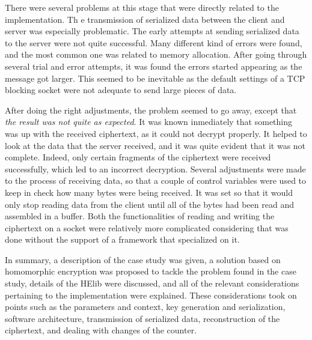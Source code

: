 There were several problems at this stage that were directly related to the implementation. Th
e transmission of serialized data between the client and server was especially problematic. The early attempts at sending serialized data to the server were not quite successful. Many different kind of errors were found, and the most common one was related to memory allocation. After going through several trial and error attempts, it was found the errors started appearing as the message got larger. This seemed to be inevitable as the default settings of a TCP blocking socket were not adequate to send large pieces of data. 

After doing the right adjustments, the problem seemed to go away, except that \textit{the result was not quite as expected}. It was known inmediately that something was up with the received ciphertext, as it could not decrypt properly. It helped to look at the data that the server received, and it was quite evident that it was not complete. Indeed, only certain fragments of the ciphertext were received successfully, which led to an incorrect decryption. Several adjustments were made to the process of receiving data, so that a couple of control variables were used to keep in check how many bytes were being received. It was set so that it would only stop reading data from the client until all of the bytes had been read and assembled in a buffer. Both the functionalities of reading and writing the ciphertext on a socket were relatively more complicated considering that was done without the support of a framework that specialized on it.

In summary, a description of the case study was given, a solution based on homomorphic encryption was proposed to tackle the problem found in the case study, details of the HElib were discussed, and all of the relevant considerations pertaining to the implementation were explained. These considerations took on points such as the parameters and context, key generation and serialization, software architecture, transmission of serialized data, reconstruction of the ciphertext, and dealing with changes of the counter. 


\clearpage
